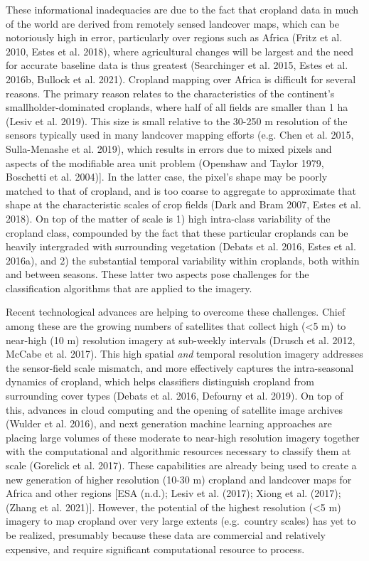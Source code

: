 \documentclass[11pt,a4paper]{article}
\begin{document}
These informational inadequacies are due to the fact that cropland data
in much of the world are derived from remotely sensed landcover maps,
which can be notoriously high in error, particularly over regions such
as Africa (Fritz et al. 2010, Estes et al. 2018), where agricultural
changes will be largest and the need for accurate baseline data is thus
greatest (Searchinger et al. 2015, Estes et al. 2016b, Bullock et al.
2021). Cropland mapping over Africa is difficult for several reasons.
The primary reason relates to the characteristics of the continent's
smallholder-dominated croplands, where half of all fields are smaller
than 1 ha (Lesiv et al. 2019). This size is small relative to the 30-250
m resolution of the sensors typically used in many landcover mapping
efforts (e.g. Chen et al. 2015, Sulla-Menashe et al. 2019), which
results in errors due to mixed pixels and aspects of the modifiable area
unit problem (Openshaw and Taylor 1979, Boschetti et al. 2004){]}. In
the latter case, the pixel's shape may be poorly matched to that of
cropland, and is too coarse to aggregate to approximate that shape at
the characteristic scales of crop fields (Dark and Bram 2007, Estes et
al. 2018). On top of the matter of scale is 1) high intra-class
variability of the cropland class, compounded by the fact that these
particular croplands can be heavily intergraded with surrounding
vegetation (Debats et al. 2016, Estes et al. 2016a), and 2) the
substantial temporal variability within croplands, both within and
between seasons. These latter two aspects pose challenges for the
classification algorithms that are applied to the imagery.

Recent technological advances are helping to overcome these challenges.
Chief among these are the growing numbers of satellites that collect
high (\textless5 m) to near-high (10 m) resolution imagery at sub-weekly
intervals (Drusch et al. 2012, McCabe et al. 2017). This high spatial
\emph{and} temporal resolution imagery addresses the sensor-field scale
mismatch, and more effectively captures the intra-seasonal dynamics of
cropland, which helps classifiers distinguish cropland from surrounding
cover types (Debats et al. 2016, Defourny et al. 2019). On top of this,
advances in cloud computing and the opening of satellite image archives
(Wulder et al. 2016), and next generation machine learning approaches
are placing large volumes of these moderate to near-high resolution
imagery together with the computational and algorithmic resources
necessary to classify them at scale (Gorelick et al. 2017). These
capabilities are already being used to create a new generation of higher
resolution (10-30 m) cropland and landcover maps for Africa and other
regions {[}ESA (n.d.); Lesiv et al. (2017); Xiong et al. (2017); (Zhang
et al. 2021){]}. However, the potential of the highest resolution
(\textless5 m) imagery to map cropland over very large extents
(e.g.~country scales) has yet to be realized, presumably because these
data are commercial and relatively expensive, and require significant
computational resource to process.
\end{document}

